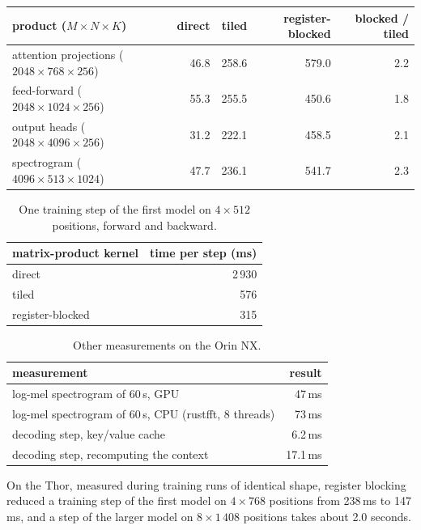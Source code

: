 \begin{widetable}
\caption{Matrix products at the sizes used by the first model, in GFLOP/s.}
\label{tab:bench-gemm}
\small
\begin{tabular}{lrrrr}
\toprule
product ($M \times N \times K$) & direct & tiled & register-blocked & blocked / tiled \\
\midrule
attention projections ($2048 \times 768 \times 256$) & 46.8 & 258.6 & 579.0 & 2.2 \\
feed-forward ($2048 \times 1024 \times 256$) & 55.3 & 255.5 & 450.6 & 1.8 \\
output heads ($2048 \times 4096 \times 256$) & 31.2 & 222.1 & 458.5 & 2.1 \\
spectrogram ($4096 \times 513 \times 1024$) & 47.7 & 236.1 & 541.7 & 2.3 \\
\bottomrule
\end{tabular}
\end{widetable}

\begin{table}[htbp]
\centering
\caption{One training step of the first model on $4 \times 512$ positions,
forward and backward.}
\label{tab:bench-train}
\small
\begin{tabular}{lr}
\toprule
matrix-product kernel & time per step (ms) \\
\midrule
direct & 2\,930 \\
tiled & 576 \\
register-blocked & 315 \\
\bottomrule
\end{tabular}
\end{table}

\begin{table}[htbp]
\centering
\caption{Other measurements on the Orin NX.}
\label{tab:bench-other}
\small
\begin{tabular}{lr}
\toprule
measurement & result \\
\midrule
log-mel spectrogram of 60\,s, GPU & 47\,ms \\
log-mel spectrogram of 60\,s, CPU (rustfft, 8 threads) & 73\,ms \\
decoding step, key/value cache & 6.2\,ms \\
decoding step, recomputing the context & 17.1\,ms \\
\bottomrule
\end{tabular}
\end{table}

On the Thor, measured during training runs of identical shape, register
blocking reduced a training step of the first model on $4 \times 768$ positions
from 238\,ms to 147\,ms, and a step of the larger model on $8 \times 1\,408$
positions takes about 2.0 seconds.

